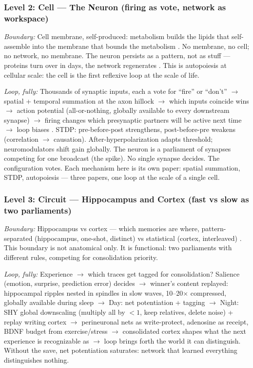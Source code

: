\documentclass[11pt]{article}
\begin{document}
\subsubsection{Level 2: Cell --- The Neuron (firing as vote, network as workspace)}

\textit{Boundary:} Cell membrane, self-produced: metabolism builds the lipids that self-assemble into the membrane that bounds the metabolism \citep{maturana1980}. No membrane, no cell; no network, no membrane. The neuron persists as a pattern, not as stuff --- proteins turn over in days, the network regenerates \citep{maturana1980}. This is autopoiesis at cellular scale: the cell is the first reflexive loop at the scale of life.

\textit{Loop, fully:} Thousands of synaptic inputs, each a vote for ``fire'' or ``don't'' $\to$ spatial + temporal summation at the axon hillock $\to$ which inputs coincide wins $\to$ action potential (all-or-nothing, globally available to every downstream synapse) $\to$ firing changes which presynaptic partners will be active next time $\to$ loop biases \citep{white1986,dorkenwald2023}. STDP: pre-before-post strengthens, post-before-pre weakens (correlation $\to$ causation). After-hyperpolarization adapts threshold; neuromodulators shift gain globally. The neuron is a parliament of synapses competing for one broadcast (the spike). No single synapse decides. The configuration votes. Each mechanism here is its own paper: spatial summation, STDP, autopoiesis --- three papers, one loop at the scale of a single cell.

\subsubsection{Level 3: Circuit --- Hippocampus and Cortex (fast vs slow as two parliaments)}

\textit{Boundary:} Hippocampus vs cortex --- which memories are where, pattern-separated (hippocampus, one-shot, distinct) vs statistical (cortex, interleaved) \citep{tononi2014}. This boundary is not anatomical only. It is functional: two parliaments with different rules, competing for consolidation priority.

\textit{Loop, fully:} Experience $\to$ which traces get tagged for consolidation? Salience (emotion, surprise, prediction error) decides \citep{seth2021} $\to$ winner's content replayed: hippocampal ripples nested in spindles in slow waves, 10--20$\times$ compressed, globally available during sleep \citep{tononi2014} $\to$ Day: net potentiation + tagging $\to$ Night: SHY global downscaling (multiply all by $<1$, keep relatives, delete noise) + replay writing cortex $\to$ perineuronal nets as write-protect, adenosine as receipt, BDNF budget from exercise/stress \citep{tononi2014} $\to$ consolidated cortex shapes what the next experience is recognizable as $\to$ loop brings forth the world it can distinguish. Without the save, net potentiation saturates: network that learned everything distinguishes nothing.
\end{document}
